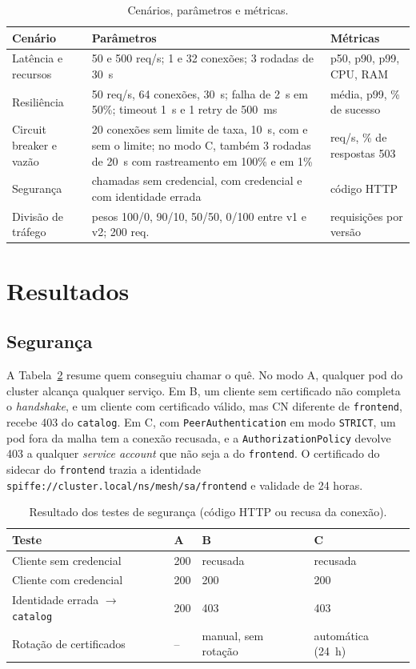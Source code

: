 \documentclass[12pt]{article}
\begin{document}
\begin{table}[ht]
\centering
\caption{Cenários, parâmetros e métricas.}
\label{tab:cenarios}
\small
\begin{tabular}{p{2.6cm}p{6.6cm}p{3.6cm}}
\toprule
Cenário & Parâmetros & Métricas \\
\midrule
Latência e recursos & 50 e 500 req/s; 1 e 32 conexões; 3 rodadas de 30~s & p50, p90, p99, CPU, RAM \\
Resiliência & 50 req/s, 64 conexões, 30~s; falha de 2~s em 50\%; timeout 1~s e 1 retry de 500~ms & média, p99, \% de sucesso \\
Circuit breaker e vazão & 20 conexões sem limite de taxa, 10~s, com e sem o limite; no modo C, também 3 rodadas de 20~s com rastreamento em 100\% e em 1\% & req/s, \% de respostas 503 \\
Segurança & chamadas sem credencial, com credencial e com identidade errada & código HTTP \\
Divisão de tráfego & pesos 100/0, 90/10, 50/50, 0/100 entre v1 e v2; 200 req. & requisições por versão \\
\bottomrule
\end{tabular}
\end{table}

\section{Resultados}

\subsection{Segurança}

A Tabela~\ref{tab:seg} resume quem conseguiu chamar o quê. No modo A, qualquer
pod do cluster alcança qualquer serviço. Em B, um cliente sem certificado não
completa o \emph{handshake}, e um cliente com certificado válido, mas CN
diferente de \texttt{frontend}, recebe 403 do \texttt{catalog}. Em C, com
\texttt{PeerAuthentication} em modo \texttt{STRICT}, um pod fora da malha tem a
conexão recusada, e a \texttt{AuthorizationPolicy} devolve 403 a qualquer
\emph{service account} que não seja a do \texttt{frontend}. O certificado do
sidecar do \texttt{frontend} trazia a identidade
\texttt{spiffe://cluster.local/ns/mesh/sa/frontend} e validade de 24 horas.

\begin{table}[ht]
\centering
\caption{Resultado dos testes de segurança (código HTTP ou recusa da conexão).}
\label{tab:seg}
\small
\begin{tabular}{llll}
\toprule
Teste & A & B & C \\
\midrule
Cliente sem credencial & 200 & recusada & recusada \\
Cliente com credencial & 200 & 200 & 200 \\
Identidade errada $\rightarrow$ \texttt{catalog} & 200 & 403 & 403 \\
Rotação de certificados & -- & manual, sem rotação & automática (24~h) \\
\bottomrule
\end{tabular}
\end{table}
\end{document}
